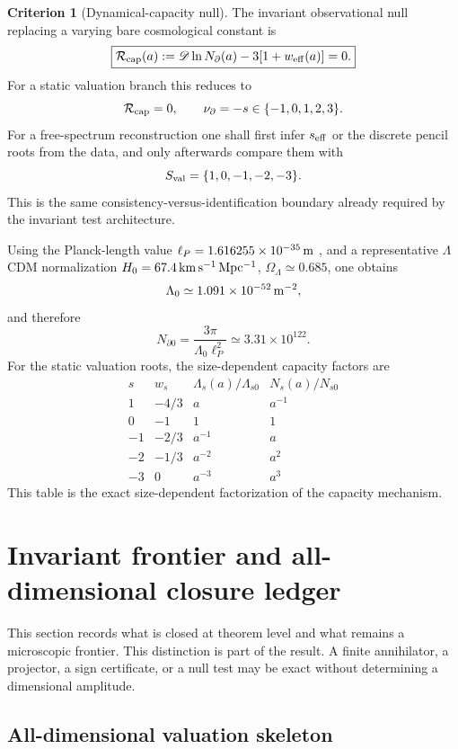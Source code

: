 \documentclass[aps,prd,reprint,nofootinbib,superscriptaddress,floatfix]{revtex4-2}
\numberwithin{equation}{section}
\theoremstyle{definition}
\newtheorem{criterion}{Criterion}[section]
\theoremstyle{plain}
\newcommand{\Dil}{\mathscr D}
\begin{document}
\begin{criterion}[Dynamical-capacity null]
The invariant observational null replacing a varying bare cosmological constant is
\[
\boxed{
\mathcal R_{\rm cap}(a):=
\Dil\ln N_\partial(a)-3[1+w_{\rm eff}(a)]=0.
}
\]
For a static valuation branch this reduces to
\[
\mathcal R_{\rm cap}=0,\qquad
\nu_\partial=-s\in\{-1,0,1,2,3\}.
\]
For a free-spectrum reconstruction one shall first infer \(s_{\rm eff}\) or the discrete pencil roots from the data, and only afterwards compare them with
\[
S_{\rm val}=\{1,0,-1,-2,-3\}.
\]
This is the same consistency-versus-identification boundary already required by the invariant test architecture.
\end{criterion}

Using the Planck-length value \( \ell_P=1.616255\times10^{-35}\,{\rm m}\) \cite{NISTPlanckLength2022}, and a representative \(\Lambda\)CDM normalization \(H_0=67.4\,{\rm km\,s^{-1}\,Mpc^{-1}}\), \(\Omega_\Lambda\simeq0.685\), one obtains
\[
\Lambda_0\simeq1.091\times10^{-52}\,{\rm m}^{-2},
\]
and therefore
\[
\boxed{
N_{\partial0}
=
\frac{3\pi}{\Lambda_0\ell_P^2}
\simeq3.31\times10^{122}.
}
\]
For the static valuation roots, the size-dependent capacity factors are
\[
\begin{array}{c|c|c|c}
s & w_s & \Lambda_s(a)/\Lambda_{s0} & N_s(a)/N_{s0}\\
\hline
1 & -4/3 & a & a^{-1}\\
0 & -1 & 1 & 1\\
-1 & -2/3 & a^{-1} & a\\
-2 & -1/3 & a^{-2} & a^2\\
-3 & 0 & a^{-3} & a^3
\end{array}
\]
This table is the exact size-dependent factorization of the capacity mechanism.




\section{Invariant frontier and all-dimensional closure ledger}
\label{sec:frontier}

This section records what is closed at theorem level and what remains a
microscopic frontier.  This distinction is part of the result.  A finite
annihilator, a projector, a sign certificate, or a null test may be exact
without determining a dimensional amplitude.

\subsection{All-dimensional valuation skeleton}
\end{document}
